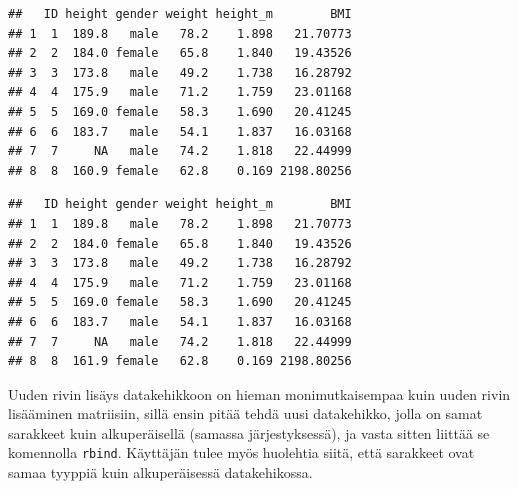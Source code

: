 \documentclass[
]{book}
\newenvironment{Shaded}{\begin{snugshade}}{\end{snugshade}}
\newcommand{\CommentTok}[1]{\textcolor[rgb]{0.56,0.35,0.01}{\textit{#1}}}
\newcommand{\ConstantTok}[1]{\textcolor[rgb]{0.00,0.00,0.00}{#1}}
\newcommand{\DecValTok}[1]{\textcolor[rgb]{0.00,0.00,0.81}{#1}}
\newcommand{\FloatTok}[1]{\textcolor[rgb]{0.00,0.00,0.81}{#1}}
\newcommand{\FunctionTok}[1]{\textcolor[rgb]{0.00,0.00,0.00}{#1}}
\newcommand{\NormalTok}[1]{#1}
\newcommand{\OtherTok}[1]{\textcolor[rgb]{0.56,0.35,0.01}{#1}}
\newcommand{\SpecialCharTok}[1]{\textcolor[rgb]{0.00,0.00,0.00}{#1}}
\begin{document}
\begin{Shaded}
\end{Shaded}

\begin{verbatim}
##   ID height gender weight height_m        BMI
## 1  1  189.8   male   78.2    1.898   21.70773
## 2  2  184.0 female   65.8    1.840   19.43526
## 3  3  173.8   male   49.2    1.738   16.28792
## 4  4  175.9   male   71.2    1.759   23.01168
## 5  5  169.0 female   58.3    1.690   20.41245
## 6  6  183.7   male   54.1    1.837   16.03168
## 7  7     NA   male   74.2    1.818   22.44999
## 8  8  160.9 female   62.8    0.169 2198.80256
\end{verbatim}

\begin{Shaded}
\end{Shaded}

\begin{verbatim}
##   ID height gender weight height_m        BMI
## 1  1  189.8   male   78.2    1.898   21.70773
## 2  2  184.0 female   65.8    1.840   19.43526
## 3  3  173.8   male   49.2    1.738   16.28792
## 4  4  175.9   male   71.2    1.759   23.01168
## 5  5  169.0 female   58.3    1.690   20.41245
## 6  6  183.7   male   54.1    1.837   16.03168
## 7  7     NA   male   74.2    1.818   22.44999
## 8  8  161.9 female   62.8    0.169 2198.80256
\end{verbatim}

Uuden rivin lisäys datakehikkoon on hieman monimutkaisempaa kuin uuden rivin lisääminen matriisiin, sillä ensin pitää tehdä uusi datakehikko, jolla on samat sarakkeet kuin alkuperäisellä (samassa järjestyksessä), ja vasta sitten liittää se komennolla \texttt{rbind}. Käyttäjän tulee myös huolehtia siitä, että sarakkeet ovat samaa tyyppiä kuin alkuperäisessä datakehikossa.
\end{document}
